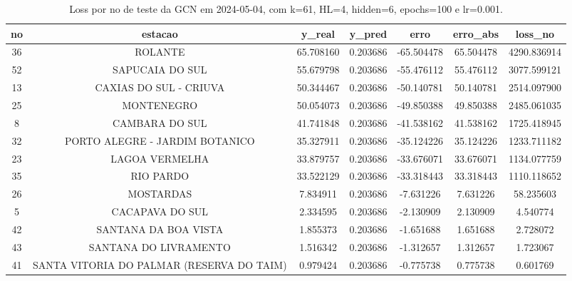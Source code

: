 \begin{table}[h]
\centering
\caption{Loss por no de teste da GCN em 2024-05-04, com k=61, HL=4, hidden=6, epochs=100 e lr=0.001.}
\label{tab:gcn_loss_k61_hl4_h6_e100_d20240504}
\begin{tabular}{ccccccc}
\toprule
no & estacao & y\_real & y\_pred & erro & erro\_abs & loss\_no \\
\midrule
36 & ROLANTE & 65.708160 & 0.203686 & -65.504478 & 65.504478 & 4290.836914 \\
52 & SAPUCAIA DO SUL & 55.679798 & 0.203686 & -55.476112 & 55.476112 & 3077.599121 \\
13 & CAXIAS DO SUL - CRIUVA & 50.344467 & 0.203686 & -50.140781 & 50.140781 & 2514.097900 \\
25 & MONTENEGRO & 50.054073 & 0.203686 & -49.850388 & 49.850388 & 2485.061035 \\
8 & CAMBARA DO SUL & 41.741848 & 0.203686 & -41.538162 & 41.538162 & 1725.418945 \\
32 & PORTO ALEGRE - JARDIM BOTANICO & 35.327911 & 0.203686 & -35.124226 & 35.124226 & 1233.711182 \\
23 & LAGOA VERMELHA & 33.879757 & 0.203686 & -33.676071 & 33.676071 & 1134.077759 \\
35 & RIO PARDO & 33.522129 & 0.203686 & -33.318443 & 33.318443 & 1110.118652 \\
26 & MOSTARDAS & 7.834911 & 0.203686 & -7.631226 & 7.631226 & 58.235603 \\
5 & CACAPAVA DO SUL & 2.334595 & 0.203686 & -2.130909 & 2.130909 & 4.540774 \\
42 & SANTANA DA BOA VISTA & 1.855373 & 0.203686 & -1.651688 & 1.651688 & 2.728072 \\
43 & SANTANA DO LIVRAMENTO & 1.516342 & 0.203686 & -1.312657 & 1.312657 & 1.723067 \\
41 & SANTA VITORIA DO PALMAR (RESERVA DO TAIM) & 0.979424 & 0.203686 & -0.775738 & 0.775738 & 0.601769 \\
\bottomrule
\end{tabular}
\end{table}
